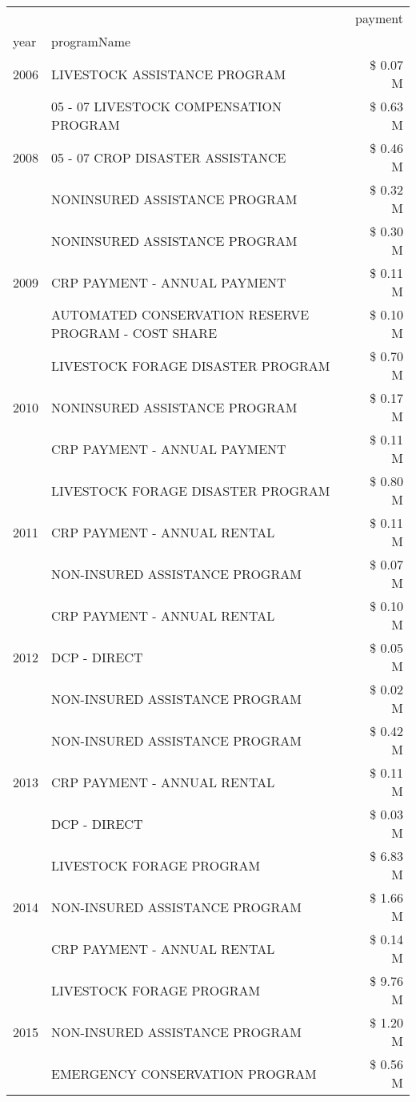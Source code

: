 \begin{tabular}{llr}
\toprule
 &  & payment \\
year & programName &  \\
\midrule
2006 & LIVESTOCK ASSISTANCE PROGRAM & \$ 0.07 M \\
\cline{1-3}
\multirow[t]{3}{*}{2008} & 05 - 07 LIVESTOCK COMPENSATION PROGRAM & \$ 0.63 M \\
 & 05 - 07 CROP DISASTER ASSISTANCE & \$ 0.46 M \\
 & NONINSURED ASSISTANCE PROGRAM & \$ 0.32 M \\
\cline{1-3}
\multirow[t]{3}{*}{2009} & NONINSURED ASSISTANCE PROGRAM & \$ 0.30 M \\
 & CRP PAYMENT - ANNUAL PAYMENT & \$ 0.11 M \\
 & AUTOMATED CONSERVATION RESERVE PROGRAM - COST SHARE & \$ 0.10 M \\
\cline{1-3}
\multirow[t]{3}{*}{2010} & LIVESTOCK FORAGE DISASTER  PROGRAM & \$ 0.70 M \\
 & NONINSURED ASSISTANCE PROGRAM & \$ 0.17 M \\
 & CRP PAYMENT - ANNUAL PAYMENT & \$ 0.11 M \\
\cline{1-3}
\multirow[t]{3}{*}{2011} & LIVESTOCK FORAGE DISASTER PROGRAM & \$ 0.80 M \\
 & CRP PAYMENT - ANNUAL RENTAL & \$ 0.11 M \\
 & NON-INSURED ASSISTANCE PROGRAM & \$ 0.07 M \\
\cline{1-3}
\multirow[t]{3}{*}{2012} & CRP PAYMENT - ANNUAL RENTAL & \$ 0.10 M \\
 & DCP - DIRECT & \$ 0.05 M \\
 & NON-INSURED ASSISTANCE PROGRAM & \$ 0.02 M \\
\cline{1-3}
\multirow[t]{3}{*}{2013} & NON-INSURED ASSISTANCE PROGRAM & \$ 0.42 M \\
 & CRP PAYMENT - ANNUAL RENTAL & \$ 0.11 M \\
 & DCP - DIRECT & \$ 0.03 M \\
\cline{1-3}
\multirow[t]{3}{*}{2014} & LIVESTOCK FORAGE PROGRAM & \$ 6.83 M \\
 & NON-INSURED ASSISTANCE PROGRAM & \$ 1.66 M \\
 & CRP PAYMENT - ANNUAL RENTAL & \$ 0.14 M \\
\cline{1-3}
\multirow[t]{3}{*}{2015} & LIVESTOCK FORAGE PROGRAM & \$ 9.76 M \\
 & NON-INSURED ASSISTANCE PROGRAM & \$ 1.20 M \\
 & EMERGENCY CONSERVATION PROGRAM & \$ 0.56 M \\

\end{tabular}
